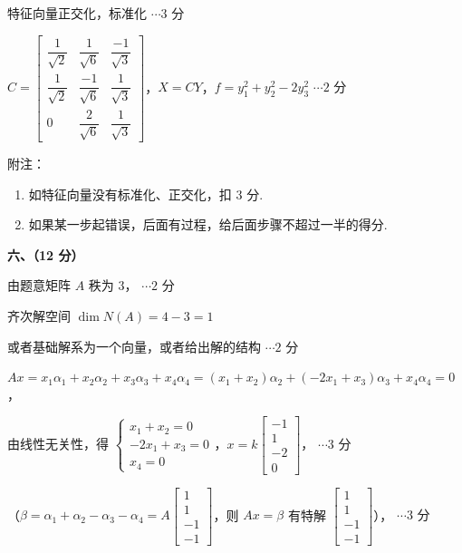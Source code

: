 \documentclass[a4paper,11pt]{ctexart}
\newcommand{\score}[1]{\hfill$\cdots\text{#1 分}$}
\begin{document}
特征向量正交化，标准化 \score{3}

$C = \begin{bmatrix}
  \dfrac{1}{\sqrt{2}} & \dfrac{1}{\sqrt{6}} & \dfrac{-1}{\sqrt{3}} \\[0.8em]
  \dfrac{1}{\sqrt{2}} & \dfrac{-1}{\sqrt{6}} & \dfrac{1}{\sqrt{3}} \\[0.8em]
  0 & \dfrac{2}{\sqrt{6}} & \dfrac{1}{\sqrt{3}}
\end{bmatrix}$，$X = CY$，$f = y_1^2 + y_2^2 - 2y_3^2$ \score{2}

附注：\par\nopagebreak
\begin{enumerate}[label=\arabic*., leftmargin=2em, itemsep=0.15em, topsep=0.2em]
  \item 如特征向量没有标准化、正交化，扣 $3$ 分.
  \item 如果某一步起错误，后面有过程，给后面步骤不超过一半的得分.
\end{enumerate}

\vspace{0.9em}

\textbf{六、（12 分）}

由题意矩阵 $A$ 秩为 $3$， \score{2}

齐次解空间 $\dim N(A) = 4 - 3 = 1$

或者基础解系为一个向量，或者给出解的结构 \score{2}

$Ax = x_1\alpha_1 + x_2\alpha_2 + x_3\alpha_3 + x_4\alpha_4 = (x_1 + x_2)\alpha_2 + (-2x_1 + x_3)\alpha_3 + x_4\alpha_4 = 0$，

由线性无关性，得 $\begin{cases} x_1 + x_2 = 0 \\ -2x_1 + x_3 = 0 \\ x_4 = 0 \end{cases}$，$x = k\begin{bmatrix} -1 \\ 1 \\ -2 \\ 0 \end{bmatrix}$， \score{3}

（$\beta = \alpha_1 + \alpha_2 - \alpha_3 - \alpha_4 = A\begin{bmatrix} 1 \\ 1 \\ -1 \\ -1 \end{bmatrix}$，则 $Ax = \beta$ 有特解 $\begin{bmatrix} 1 \\ 1 \\ -1 \\ -1 \end{bmatrix}$）， \score{3}
\end{document}
